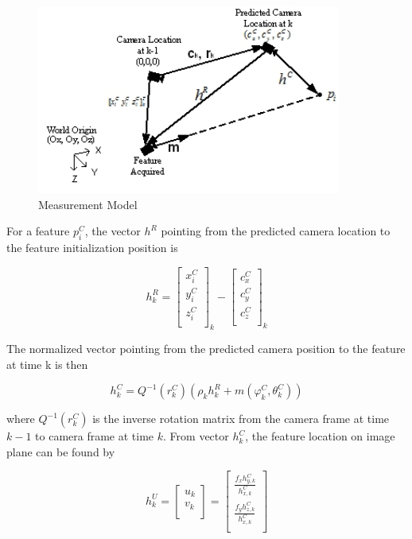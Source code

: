 \begin{figure}[h]
\centering
\includegraphics[width=10cm, keepaspectratio=true]{./Figures/measurement_model.jpg}
\caption{Measurement Model}
\label{fig:measurement_model}
\end{figure}

For a feature $p_{i}^{C}$, the vector $h^{R}$ pointing from the 
predicted camera location to the feature initialization position is 

\begin{equation}
h_{k}^{R}=\begin{bmatrix}
x_{i}^{C} \\
y_{i}^{C} \\
z_{i}^{C} \\
\end{bmatrix}_{k}-\begin{bmatrix}
c_{x}^{C} \\
c_{y}^{C} \\
c_{z}^{C} \\
\end{bmatrix}_{k}
\end{equation}

The normalized vector pointing from the predicted camera position to the 
feature at time k is then 

\begin{equation}
  h_{k}^{C}=Q^{-1}\left(r_{k}^{C}\right)\left(\rho _{k}h_{k}^{R}+m\left(\varphi_{ 
        k}^{C},\theta _{k}^{C}\right)\right)
\end{equation}

\noindent where $Q^{-1}(r_{k}^{C})$ is the inverse rotation matrix from the 
camera frame at time $k-1$ to camera frame at time $k$. From vector 
$h_{k}^{C}$, the feature location on image plane can be found by

\begin{equation}
h_{k}^{U}= \begin{bmatrix}
u_{k} \\
v_{k} \\
\end{bmatrix}=\begin{bmatrix}
\frac{f_{x}h_{y,k}^{C}}{h_{x,k}^{C}} \\
\frac{f_{y}h_{z,k}^{C}}{h_{x,k}^{C}} \\
\end{bmatrix}
\end{equation}

